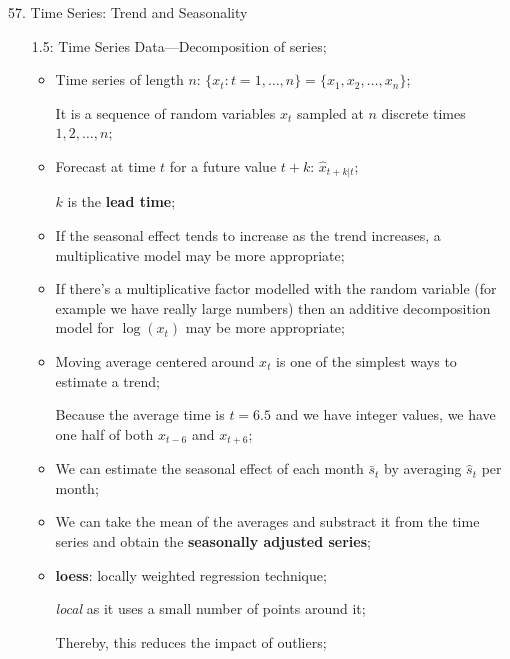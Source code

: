 \begin{CHPT_SUMM_AUTO}[label = {L.-57}]{57. Time Series: Trend and Seasonality}
\begin{itemize}
\begin{itemize}
		\texttt{[image: src/TS-TREND-SPLIT-PLOTS.png]}
		\item	This also highlights the importance of not extrapolating---without additional information we don't know whether the trend will continue;
		\item	Idea that 2 unrelated time series will be correlated if they both contain a trend thus we can't attribute global warming to fossil fuel increase without a physical explanation;
		\item	As per scientists, we judge appropriate to attribute a \textbf{causal relationship} and to expect mean global temperature to continue rising if greenhouse gas emissions aren't reduced;
		\end{itemize}
	\item[1.5:]	Time Series Data---Decomposition of series;
		\begin{itemize}
	\item	Time series of length $n$: $\{x_{t} : t = 1, \dots, n\} = \{x_{1}, x_{2}, \dots, x_{n}\}$;
	\item[]	It is a sequence of random variables $x_{t}$ sampled at $n$ discrete times $1, 2, \dots, n$;
	\item	Forecast at time $t$ for a future value $t + k$: $\hat{x}_{t + k | t}$;
	\item[]	$k$ is the \textbf{lead time};
		\end{itemize}
		\begin{itemize}
		\item	If the seasonal effect tends to increase as the trend increases, a multiplicative model may be more appropriate;
		\item	If there's a multiplicative factor modelled with the random variable (for example we have really large numbers) then an additive decomposition model for $\log(x_{t})$ may be more appropriate;
		\end{itemize}
		\begin{itemize}
		\item	Moving average centered around $x_{t}$ is one of the simplest ways to estimate a trend;
		\item[]	Because the average time is $t = 6.5$ and we have integer values, we have one half of both $x_{t - 6}$ and $x_{t + 6}$;
		\item	We can estimate the seasonal effect of each month $\bar{s}_{t}$ by averaging $\hat{s}_{t}$ per month;
		\item	We can take the mean of the averages and substract it from the time series and obtain the \textbf{seasonally adjusted series};
		\end{itemize}
		\begin{itemize}
		\item	\textbf{loess}: locally weighted regression technique;
		\item[]	\og \textit{local} \fg{} as it uses a \og small \fg{}  number of points \og around \fg{}  it;
		\item[]	Thereby, this reduces the impact of outliers;
		\end{itemize}
\end{itemize}


\end{CHPT_SUMM_AUTO}
